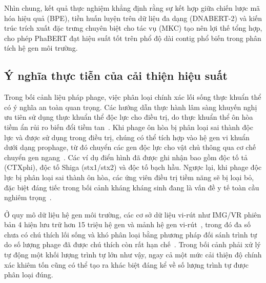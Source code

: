 Nhìn chung, kết quả thực nghiệm khẳng định rằng sự kết hợp giữa chiến lược mã hóa hiệu quả (BPE), tiền huấn luyện trên dữ liệu đa dạng (DNABERT-2) và kiến trúc trích xuất đặc trưng chuyên biệt cho tác vụ (MKC) tạo nên lợi thế tổng hợp, cho phép PhaBERT đạt hiệu suất tốt trên phổ độ dài contig phổ biến trong phân tích hệ gen môi trường.

\subsection{Ý nghĩa thực tiễn của cải thiện hiệu suất}
\label{sec:practical_significance}

Trong bối cảnh liệu pháp phage, việc phân loại chính xác lối sống thực khuẩn thể có ý nghĩa an toàn quan trọng. Các hướng dẫn thực hành lâm sàng khuyến nghị ưu tiên sử dụng thực khuẩn thể độc lực cho điều trị, do thực khuẩn thể ôn hòa tiềm ẩn rủi ro biến đổi tiềm tan~\cite{feiner2015new}. Khi phage ôn hòa bị phân loại sai thành độc lực và được sử dụng trong điều trị, chúng có thể tích hợp vào hệ gen vi khuẩn dưới dạng prophage, từ đó chuyển các gen độc lực cho vật chủ thông qua cơ chế chuyển gen ngang~\cite{brussow2004phages}. Các ví dụ điển hình đã được ghi nhận bao gồm độc tố tả (CTXphi), độc tố Shiga (stx1/stx2) và độc tố bạch hầu. Ngược lại, khi phage độc lực bị phân loại sai thành ôn hòa, các ứng viên điều trị tiềm năng sẽ bị loại bỏ, đặc biệt đáng tiếc trong bối cảnh kháng kháng sinh đang là vấn đề y tế toàn cầu nghiêm trọng~\cite{azimi2019phage}.

Ở quy mô dữ liệu hệ gen môi trường, các cơ sở dữ liệu vi-rút như IMG/VR phiên bản 4 hiện lưu trữ hơn 15 triệu hệ gen và mảnh hệ gen vi-rút~\cite{camargo2023imgvr}, trong đó đa số chưa có chú thích lối sống và khó phân loại bằng phương pháp đối sánh trình tự do số lượng phage đã được chú thích còn rất hạn chế~\cite{shang2023phatyp}. Trong bối cảnh phải xử lý tự động một khối lượng trình tự lớn như vậy, ngay cả một mức cải thiện độ chính xác khiêm tốn cũng có thể tạo ra khác biệt đáng kể về số lượng trình tự được phân loại đúng.


